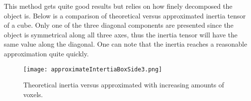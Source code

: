  This method gets quite
 good results but relies on how finely decomposed the object is.
 Below is a comparison of theoretical versus approximated inertia tensor of a cube.
 Only one of the three diagonal components are presented since the object is symmetrical
 along all three axes, thus the inertia tensor will have the same value along the diagonal.
 One can note that the inertia reaches a reasonable approximation quite quickly.


 \begin{figure}[H]
   \centering
   \texttt{[image: approximateIntertiaBoxSide3.png]}
   \caption{Theoretical inertia versus approximated with increasing amounts of voxels.}
   \label{fig:appInertia}
 \end{figure}

%
